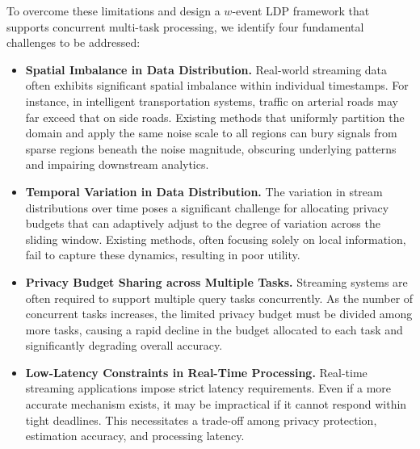 \documentclass[acmsmall]{acmart}
\begin{document}
To overcome these limitations and design a $w$-event LDP framework that supports
concurrent multi-task processing, we identify four fundamental challenges to be
addressed:
\begin{itemize}[nosep]
\item \textbf{Spatial Imbalance in Data Distribution.}
  Real-world streaming data often exhibits significant spatial imbalance within
  individual timestamps.
  For instance, in intelligent transportation systems, traffic on arterial roads
  may far exceed that on side roads.
  Existing methods that uniformly partition the domain and apply the same noise scale to all regions can bury signals from sparse regions beneath the noise magnitude, obscuring underlying patterns and impairing downstream analytics.

\item \textbf{Temporal Variation in Data Distribution.}
  The variation in stream distributions over time poses a significant challenge for
  allocating privacy budgets that can adaptively adjust to the degree of
  variation across the sliding window.
  Existing methods, often focusing solely on local information, fail to capture these dynamics, resulting in poor utility.

\item \textbf{Privacy Budget Sharing across Multiple Tasks.}
  Streaming systems are often required to support multiple query tasks
  concurrently.
  As the number of concurrent tasks increases, the limited privacy budget must
  be divided among more tasks, causing a rapid decline in the budget allocated
  to each task and significantly degrading overall accuracy.

\item \textbf{Low-Latency Constraints in Real-Time Processing.}
  Real-time streaming applications impose strict latency requirements.
  Even if a more accurate mechanism exists, it may be impractical if it cannot
  respond within tight deadlines.
  This necessitates a trade-off among privacy protection, estimation accuracy,
  and processing latency.
\end{itemize}
\end{document}
